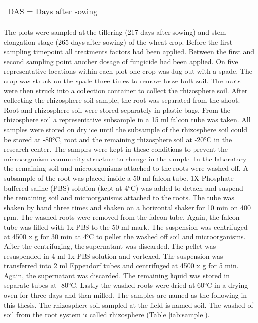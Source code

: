 \documentclass[twoside,12pt,final]{ucthesis-CA2012}
\begin{document}
\begin{ucmainmatter}
\begin{table}
\begin{tabular}[t]{lllllll}
\multicolumn{7}{l}{\rule{0pt}{1em}DAS = Days after sowing}\\
\end{tabular}
\end{table}
The plots were sampled at the tillering (217 days after sowing) and stem elongation stage (265 days after sowing) of the wheat crop. Before the first sampling timepoint all treatments factors had been applied. Between the first and second sampling point another dosage of fungicide had been applied.
On five representative locations within each plot one crop was dug out with a spade. The crop was struck on the spade three times to remove loose bulk soil. The roots were then struck into a collection container to collect the rhizosphere soil. After collecting the rhizosphere soil sample, the root was separated from the shoot. Root and rhizosphere soil were stored separately in plastic bags. From the rhizosphere soil a representative subsample in a 15 ml falcon tube was taken. All samples were stored on dry ice until the subsample of the rhizosphere soil could be stored at -80°C, root and the remaining rhizosphere soil at -20°C in the research center. The samples were kept in these conditions to prevent the microorganism community structure to change in the sample.
In the laboratory the remaining soil and microorganisms attached to the roots were washed off. A subsample of the root was placed inside a 50 ml falcon tube. 1X Phosphate-buffered saline (PBS) solution (kept at 4°C) was added to detach and suspend the remaining soil and microorganisms attached to the roots. The tube was shaken by hand three times and shaken on a horizontal shaker for 10 min on 400 rpm. The washed roots were removed from the falcon tube. Again, the falcon tube was filled with 1x PBS to the 50 ml mark. The suspension was centrifuged at 4500 x g for 30 min at 4°C to pellet the washed off soil and microorganisms. After the centrifuging, the supernatant was discarded. The pellet was resuspended in 4 ml 1x PBS solution and vortexed. The suspension was transferred into 2 ml Eppendorf tubes and centrifuged at 4500 x g for 5 min. Again, the supernatant was discarded. The remaining liquid was stored in separate tubes at -80°C. Lastly the washed roots were dried at 60°C in a drying oven for three days and then milled.
The samples are named as the following in this thesis. The rhizosphere soil sampled at the field is named soil. The washed of soil from the root system is called rhizosphere (Table \ref{tab:sample}).
\begin{table}


\end{table}
\end{ucmainmatter}
\end{document}
